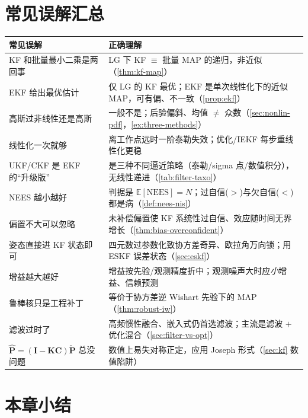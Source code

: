 \section*{常见误解汇总}
\begin{table}[ht]\centering\small
\begin{tabular}{p{} p{}}
\toprule
\textbf{常见误解} & \textbf{正确理解} \\
\midrule
KF 和批量最小二乘是两回事 & LG 下 KF $\equiv$ 批量 MAP 的递归，非近似（\cref{thm:kf-map}）\\
EKF 给出最优估计 & 仅 LG 的 KF 最优；EKF 是单次线性化下的近似 MAP，可有偏、不一致（\cref{prop:ekf}）\\
高斯过非线性还是高斯 & 一般不是；后验偏斜、均值 $\ne$ 众数（\cref{sec:nonlin-pdf}，\cref{ex:three-methods}）\\
线性化一次就够 & 离工作点远时一阶泰勒失效；优化/IEKF 每步重线性化更稳 \\
UKF/CKF 是 EKF 的“升级版” & 是三种不同逼近策略（泰勒/sigma 点/数值积分），无线性递进（\cref{tab:filter-taxo}）\\
NEES 越小越好 & 判据是 $\mathbb{E}[\text{NEES}]=N$；过自信($>$)与欠自信($<$)都是病（\cref{def:nees-nis}）\\
偏置不大可以忽略 & 未补偿偏置使 KF 系统性过自信、效应随时间无界增长（\cref{thm:bias-overconfident}）\\
姿态直接进 KF 状态即可 & 四元数过参数化致协方差奇异、欧拉角万向锁；用 ESKF 误差状态（\cref{sec:eskf}）\\
增益越大越好 & 增益按先验/观测精度折中；观测噪声大时应\emph{小}增益、信赖预测 \\
鲁棒核只是工程补丁 & 等价于协方差逆 Wishart 先验下的 MAP（\cref{thm:robust-iw}）\\
滤波过时了 & 高频惯性融合、嵌入式仍首选滤波；主流是滤波 $+$ 优化混合（\cref{sec:filter-vs-opt}）\\
$\hat{\mathbf{P}}=(\mathbf{I}-\mathbf{K}\mathbf{C})\check{\mathbf{P}}$ 总没问题 & 数值上易失对称正定，应用 Joseph 形式（\cref{sec:kf} 数值陷阱）\\
\bottomrule
\end{tabular}
\end{table}

\section*{本章小结}

